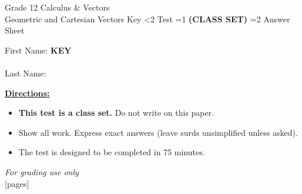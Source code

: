 \documentclass[addpoints]{exam}
\newcommand{\event}{Geometric and Cartesian Vectors}
\newcommand{\tournament}{}
\def\type{0}
\begin{document}
\begin{center}
    {\huge Grade 12 Calculus \& Vectors \\ \event
    \ifprintanswers \space Key
    \else \space \ifnum\type<2 Test \fi \ifnum\type=1 \textbf{(CLASS SET)} \fi
          \ifnum\type=2 Answer Sheet \fi
    \fi \\ \vspace{3mm}\tournament\vspace{1mm}}
\end{center}

\vspace{.25\textheight}

\begin{center}
    First Name: \ifprintanswers
    \underline{\hspace{3.5cm}}\textbf{KEY}\underline{\hspace{5.5cm}}\\\vspace{5mm}
    \else \underline{\hspace{10cm}}\\ \vspace{5mm} \fi
    Last Name: \underline{\hspace{10cm}}\\ \vspace{5mm}
\end{center}

\noindent\textbf{\underline{Directions:}}
\begin{itemize}
    \ifnum\type=1 \item \textbf{This test is a class set.} Do not write on this paper. \fi
    \item Show all work. Express exact answers (leave surds unsimplified unless asked).
    \item The test is designed to be completed in 75 minutes.
\end{itemize}
\begin{center}
\textit{For grading use only}\\
[pages]
\end{center}
\end{document}
